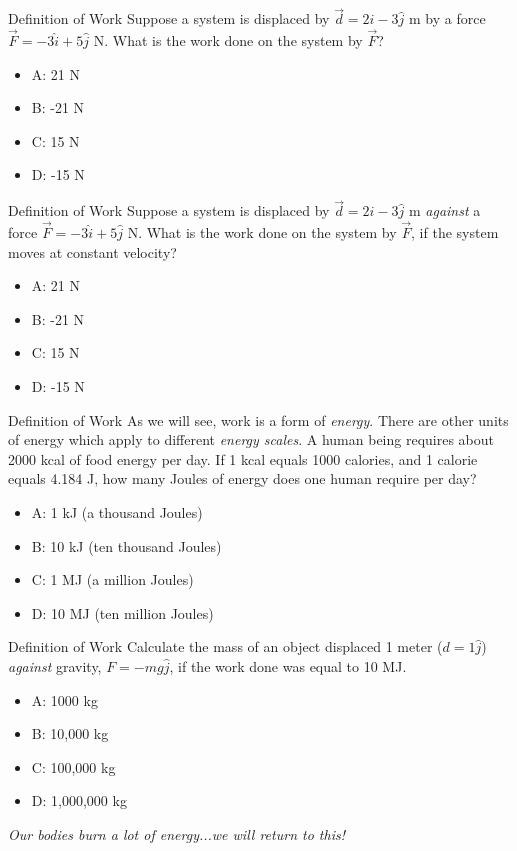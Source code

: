 \documentclass{beamer}
\begin{document}
\begin{frame}{Definition of Work}
Suppose a system is displaced by $\vec{d} = 2\hat{i}-3\hat{j}$ m by a force $\vec{F} = -3\hat{i}+5\hat{j}$ N.  What is the work done on the system by $\vec{F}$?
\begin{itemize}
\item A: 21 N
\item B: -21 N
\item C: 15 N
\item D: -15 N
\end{itemize}
\end{frame}

\begin{frame}{Definition of Work}
Suppose a system is displaced by $\vec{d} = 2\hat{i}-3\hat{j}$ m \textit{against} a force $\vec{F} = -3\hat{i}+5\hat{j}$ N.  What is the work done on the system by $\vec{F}$, if the system moves at constant velocity?
\begin{itemize}
\item A: 21 N
\item B: -21 N
\item C: 15 N
\item D: -15 N
\end{itemize}
\end{frame}

\begin{frame}{Definition of Work}
As we will see, work is a form of \textit{energy}.  There are other units of energy which apply to different \textit{energy scales}.  A human being requires about 2000 kcal of food energy per day.  If 1 kcal equals 1000 calories, and 1 calorie equals 4.184 J, how many Joules of energy does one human require per day?
\begin{itemize}
\item A: 1 kJ (a thousand Joules)
\item B: 10 kJ (ten thousand Joules)
\item C: 1 MJ (a million Joules)
\item D: 10 MJ (ten million Joules) 
\end{itemize}
\end{frame}

\begin{frame}{Definition of Work}
Calculate the mass of an object displaced 1 meter ($d = 1\hat{j}$) \textit{against} gravity, $F = -mg\hat{j}$, if the work done was equal to 10 MJ.
\begin{itemize}
\item A: 1000 kg
\item B: 10,000 kg
\item C: 100,000 kg
\item D: 1,000,000 kg
\end{itemize}
\textit{Our bodies burn a lot of energy...we will return to this!}
\end{frame}
\end{document}
